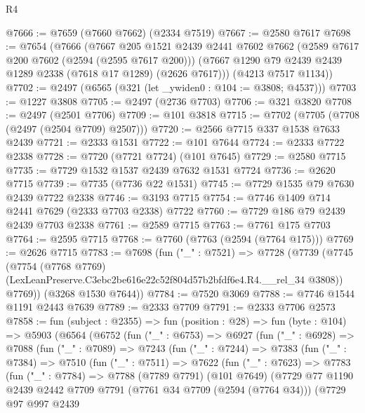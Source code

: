 \begin{lexlean}{R4}
\begin{coremodule}
@7666 := @7659 (@7660 @7662) (@2334 @7519)
@7667 := @2580 @7617
@7698 := @7654
    (@7666
      (@7667
        @205
        @1521
        @2439
        @2441
        @7602
        @7662
        (@2589 @7617 @200 @7602 (@2594 (@2595 @7617 @200)))
        (@7667 @1290 @79 @2439 @2439 @1289 @2338 (@7618 @17 @1289) (@2626 @7617)))
      (@4213 @7517 @1134))
@7702 := @2497 (@6565 (@321 (let _ywiden0 : @104 := @3808; @4537)))
@7703 := @1227 @3808
@7705 := @2497 (@2736 @7703)
@7706 := @321 @3820
@7708 := @2497 (@2501 @7706)
@7709 := @101 @3818
@7715 := @7702 (@7705 (@7708 (@2497 (@2504 @7709) @2507)))
@7720 := @2566 @7715 @337 @1538 @7633 @2439
@7721 := @2333 @1531
@7722 := @101 @7644
@7724 := @2333 @7722 @2338
@7728 := @7720 (@7721 @7724) (@101 @7645)
@7729 := @2580 @7715
@7735 := @7729 @1532 @1537 @2439 @7632 @1531 @7724
@7736 := @2620 @7715
@7739 := @7735 (@7736 @22 @1531)
@7745 := @7729 @1535 @79 @7630 @2439 @7722 @2338
@7746 := @3193 @7715
@7754 := @7746 @1409 @714 @2441 @7629 (@2333 @7703 @2338) @7722
@7760 := @7729 @186 @79 @2439 @2439 @7703 @2338
@7761 := @2589 @7715
@7763 := @7761 @175 @7703
@7764 := @2595 @7715
@7768 := @7760 (@7763 (@2594 (@7764 @175)))
@7769 := @2626 @7715
@7783 := @7698
    (fun ("_" : @7521) =>
    @7728
      (@7739
        (@7745
          (@7754
            (@7768 @7769)
            (LexLeanPreserve.C3ebc2be616e22c52f804d57b2bfdf6e4.R4.__rel_34 @3808))
          @7769))
      (@3268 @1530 @7644))
@7784 := @7520 @3069
@7788 := @7746 @1544 @1191 @2443 @7639
@7789 := @2333 @7709
@7791 := @2333 @7706 @2573
@7858 := fun (subject : @2355) =>
  fun (position : @28) =>
  fun (byte : @104) =>
  @5903
    (@6564
      (@6752
        (fun ("_" : @6753) =>
        @6927
          (fun ("_" : @6928) =>
          @7088
            (fun ("_" : @7089) =>
            @7243
              (fun ("_" : @7244) =>
              @7383
                (fun ("_" : @7384) =>
                @7510
                  (fun ("_" : @7511) =>
                  @7622
                    (fun ("_" : @7623) =>
                    @7783
                      (fun ("_" : @7784) =>
                      @7788
                        (@7789 @7791)
                        (@101 @7649)
                        (@7729
                          @77
                          @1190
                          @2439
                          @2442
                          @7709
                          @7791
                          (@7761 @34 @7709 (@2594 (@7764 @34)))
                          (@7729
                            @97
                            @997
                            @2439

\end{coremodule}
\end{lexlean}

